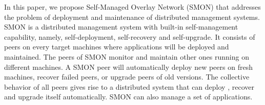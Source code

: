 
In this paper, we propose Self-Managed Overlay Network
(SMON) that addresses the problem of deployment and
maintenance of distributed management systems.  SMON is a
distributed management system with built-in self-management
capability, namely, self-deployment, self-recovery and
self-upgrade. It consists of peers on every target machines
where applications will be deployed and maintained. The
peers of SMON monitor and maintain other ones running on
different machines. A SMON peer will automatically deploy
new peers on fresh machines, recover failed peers, or
upgrade peers of old versions. The collective behavior of
all peers gives rise to a distributed system that can deploy
, recover  and upgrade itself automatically. SMON can also
manage a set of applications.


